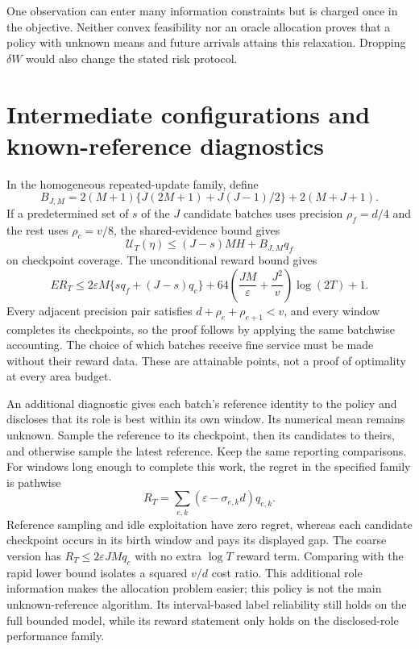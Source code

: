 One observation can enter many information constraints but is charged once
in the objective. Neither convex feasibility nor an oracle allocation proves
that a policy with unknown means and future arrivals attains this relaxation.
Dropping $\delta W$ would also change the stated risk protocol.

\section{Intermediate configurations and known-reference diagnostics}
\label{app:variants}

In the homogeneous repeated-update family, define
\[
 B_{J,M}=2(M+1)\{J(2M+1)+J(J-1)/2\}+2(M+J+1).
\]
If a predetermined set of $s$ of the $J$ candidate batches uses precision
$\rho_f=d/4$ and the rest uses $\rho_c=v/8$, the shared-evidence bound gives
\[
 \mathcal U_T(\eta)\le(J-s)MH+B_{J,M}q_f
\]
on checkpoint coverage. The unconditional reward bound gives
\[
 ER_T\le2\varepsilon M\{sq_f+(J-s)q_c\}
 +64\left(\frac{JM}{\varepsilon}+\frac{J^2}{v}\right)\log(2T)+1.
\]
Every adjacent precision pair satisfies
$d+\rho_e+\rho_{e+1}<v$, and every window completes its checkpoints, so
the proof follows by applying the same batchwise accounting. The choice of
which batches receive fine service must be made without their reward data.
These are attainable points, not a proof of optimality at every area budget.

An additional diagnostic gives each batch's reference identity to the policy
and discloses that its role is best within its own window. Its numerical mean
remains unknown. Sample the reference to its checkpoint, then its candidates
to theirs, and otherwise sample the latest reference. Keep the same reporting
comparisons. For windows long enough to complete this work, the regret in the
specified family is pathwise
\[
 R_T=\sum_{e,k}(\varepsilon-\sigma_{e,k}d)q_{e,k}.
\]
Reference sampling and idle exploitation have zero regret, whereas each
candidate checkpoint occurs in its birth window and pays its displayed gap.
The coarse version has $R_T\le2\varepsilon JM q_c$ with no extra $\log T$
reward term. Comparing with the rapid lower bound isolates a squared
$v/d$ cost ratio. This additional role information makes the allocation
problem easier; this policy is not the main unknown-reference algorithm.
Its interval-based label reliability still holds on the full bounded model,
while its reward statement only holds on the disclosed-role performance family.

